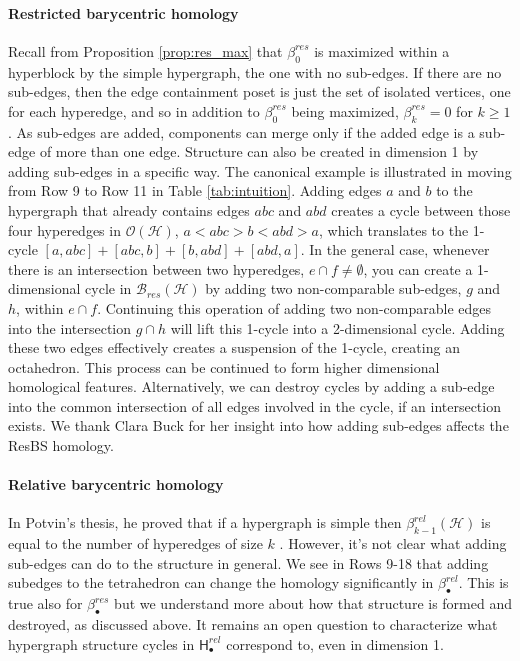 \documentclass{amsart}
\newcommand{\Hgroup}	     {\mathsf{H}}
\renewcommand{\hom}[2]{\Hgroup_{#2}^{#1}}
\newcommand{\betti}[2]{\beta_{#2}^{#1}}
\renewcommand{\H}{\mathcal{H}}
\newcommand{\bary}{\mathcal{B}}
\newcommand{\ECP}{\mathcal{O}}
\begin{document}
\paragraph{\textbf{Restricted barycentric homology}}
Recall from Proposition \ref{prop:res_max} that $\betti{res}{0}$ is maximized within a hyperblock by the simple hypergraph, the one with no sub-edges. If there are no sub-edges, then the edge containment poset is just the set of isolated vertices, one for each hyperedge, and so in addition to $\betti{res}{0}$ being maximized, $\betti{res}{k}=0$ for $k \geq 1$. As sub-edges are added, components can merge only if the added edge is a sub-edge of more than one edge. Structure can also be created in dimension 1 by adding sub-edges in a specific way. The canonical example is illustrated in moving from Row 9 to Row 11 in Table \ref{tab:intuition}. Adding edges $a$ and $b$ to the hypergraph that already contains edges $abc$ and $abd$ creates a cycle between those four hyperedges in $\ECP(\H)$, $a < abc > b < abd > a$, which translates to the 1-cycle $[a, abc]+[abc, b]+[b, abd]+[abd,a]$. In the general case, whenever there is an intersection between two hyperedges, $e \cap f \neq \emptyset$, you can create a 1-dimensional cycle in $\bary_{res}(\H)$ by adding two non-comparable sub-edges, $g$ and $h$, within $e \cap f$. Continuing this operation of adding two non-comparable edges into the intersection $g \cap h$ will lift this 1-cycle into a 2-dimensional cycle. Adding these two edges effectively creates a suspension of the 1-cycle, creating an octahedron. 
This process can be continued to form higher dimensional homological features.
Alternatively, we can destroy cycles by adding a sub-edge into the common intersection of all edges involved in the cycle, if an intersection exists. 
We thank Clara Buck for her insight into how adding sub-edges affects the ResBS homology.
\\
\paragraph{\textbf{Relative barycentric homology}}
In Potvin's thesis, he proved that if a hypergraph is simple then $\betti{rel}{k-1}(\H)$ is equal to the number of hyperedges of size $k$ \cite[Theorem 4.3.9]{potvin2023hypergraphs}. However, it's not clear what adding sub-edges can do to the structure in general. We see in Rows 9-18 that adding subedges to the tetrahedron can change the homology significantly in $\betti{rel}{\bullet}$. This is true also for $\betti{res}{\bullet}$ but we understand more about how that structure is formed and destroyed, as discussed above. It remains an open question to characterize what hypergraph structure cycles in $\hom{rel}{\bullet}$ correspond to, even in dimension 1.
\\
\end{document}
